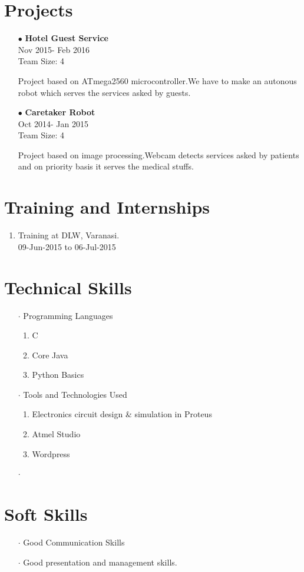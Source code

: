 \documentclass[11pt]{article}
\begin{document}
	\section*{Projects}
	\begin{itemize}
		\item[$\bullet$]\textbf{Hotel Guest Service}\\Nov 2015- Feb 2016\\Team Size: 4
		
		Project based on ATmega2560 microcontroller.We have to make an autonous robot which serves the services asked by guests.
		\item[$\bullet$]
		\textbf{Caretaker Robot}\\Oct 2014- Jan 2015\\Team Size: 4
		
		Project based on image processing.Webcam detects services asked by patients and on priority basis it serves the medical stuffs. 
	\end{itemize}
	\section*{Training and Internships}
	\begin{enumerate}
		\item Training at DLW, Varanasi.\\09-Jun-2015 to 06-Jul-2015
	\end{enumerate}
	\section*{Technical Skills}
	\begin{itemize}
		\item[$\cdot$]Programming Languages
		\begin{enumerate}
			\item C
			\item Core Java
			\item Python Basics
		\end{enumerate}
		\item[$\cdot$]Tools and Technologies Used
		\begin{enumerate}
			\item Electronics circuit design \& simulation in Proteus
			\item Atmel Studio
			\item Wordpress
		\end{enumerate}
	\end{itemize}
	\begin{itemize}
		\item[$\cdot$]
	\end{itemize}
	\section*{Soft Skills}
	\begin{itemize}
		\item[$\cdot$] Good Communication Skills		\item[$\cdot$]Good presentation and management skills.
	\end{itemize}


	
\end{document}
